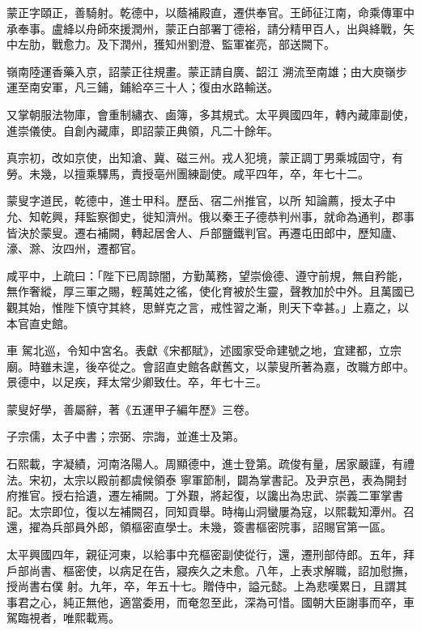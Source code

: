 \begin{pinyinscope}
 蒙正字頤正，善騎射。乾德中，以蔭補殿直，遷供奉官。王師征江南，命乘傳軍中承奉事。盧絳以舟師來援潤州，蒙正白部署丁德裕，請分精甲百人，出與絳戰，矢中左肋，戰愈力。及下潤州，獲知州劉澄、監軍崔亮，部送闕下。



 嶺南陸運香藥入京，詔蒙正往規畫。蒙正請自廣、韶江
 溯流至南雄；由大庾嶺步運至南安軍，凡三鋪，鋪給卒三十人；復由水路輸送。



 又掌朝服法物庫，會重制繡衣、鹵簿，多其規式。太平興國四年，轉內藏庫副使，進崇儀使。自創內藏庫，即詔蒙正典領，凡二十餘年。



 真宗初，改如京使，出知滄、冀、磁三州。戎人犯境，蒙正調丁男乘城固守，有勞。未幾，以擅乘驛馬，責授亳州團練副使。咸平四年，卒，年七十二。



 蒙叟字道民，乾德中，進士甲科。歷岳、宿二州推官，以所
 知論薦，授太子中允、知乾興，拜監察御史，徙知濟州。俄以秦王子德恭判州事，就命為通判，郡事皆決於蒙叟。遷右補闕，轉起居舍人、戶部鹽鐵判官。再遷屯田郎中，歷知廬、濠、滁、汝四州，遷都官。



 咸平中，上疏曰：「陛下已周諒闇，方勤萬務，望崇儉德、遵守前規，無自矜能，無作奢縱，厚三軍之賜，輕萬姓之徭，使化育被於生靈，聲教加於中外。且萬國已觀其始，惟陛下慎守其終，思鮮克之言，戒性習之漸，則天下幸甚。」上嘉之，以本官直史館。



 車
 駕北巡，令知中宮名。表獻《宋都賦》，述國家受命建號之地，宜建都，立宗廟。時雖未遑，後卒從之。會詔直史館各獻舊文，以蒙叟所著為嘉，改職方郎中。景德中，以足疾，拜太常少卿致仕。卒，年七十三。



 蒙叟好學，善屬辭，著《五運甲子編年歷》三卷。



 子宗儒，太子中書；宗弼、宗誨，並進士及第。



 石熙載，字凝績，河南洛陽人。周顯德中，進士登第。疏俊有量，居家嚴謹，有禮法。宋初，太宗以殿前都虞候領泰
 寧軍節制，闢為掌書記。及尹京邑，表為開封府推官。授右拾遺，遷左補闕。丁外艱，將起復，以讒出為忠武、崇義二軍掌書記。太宗即位，復以左補闕召，同知貢舉。時梅山洞蠻屢為寇，以熙載知潭州。召還，擢為兵部員外郎，領樞密直學士。未幾，簽書樞密院事，詔賜官第一區。



 太平興國四年，親征河東，以給事中充樞密副使從行，還，遷刑部侍郎。五年，拜戶部尚書、樞密使，以病足在告，寢疾久之未愈。八年，上表求解職，詔加慰撫，授尚書右僕
 射。九年，卒，年五十七。贈侍中，謚元懿。上為悲嘆累日，且謂其事君之心，純正無他，適當委用，而奄忽至此，深為可惜。國朝大臣謝事而卒，車駕臨視者，唯熙載焉。




\end{pinyinscope}
